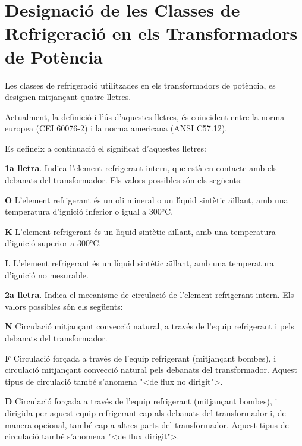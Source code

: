 \chapter{Designaci\'{o} de les Classes de Refrigeraci\'{o}
en els Transformadors de Pot\`{e}ncia}
  

Les classes de refrigeraci\'{o} utilitzades en els transformadors de
pot\`{e}ncia, es designen mitjan\c{c}ant quatre lletres.

Actualment, la definici\'{o} i l'\'{u}s d'aquestes lletres, \'{e}s coincident
entre la norma europea (\textsf{CEI 60076-2}) i la norma americana
(\textsf{ANSI C57.12}).

Es defineix a continuaci\'{o} el significat d'aquestes lletres:

\textbf{1a lletra}. Indica l'element refrigerant intern, que est\`{a} en
contacte amb els debanats del transformador. Els valors possibles
s\'{o}n els seg\"{u}ents:
\begin{list}{}
   {\setlength{\labelwidth}{10mm} \setlength{\leftmargin}{10mm} \setlength{\labelsep}{2mm}}
   \item[\textbf{O}] L'element refrigerant \'{e}s un oli mineral o un l\'{\i}quid sint\`{e}tic a\"{\i}llant, amb una temperatura d'ignici\'{o}
   inferior o igual a 300\unit{\celsius}.
   \item[\textbf{K}] L'element refrigerant \'{e}s un l\'{\i}quid sint\`{e}tic a\"{\i}llant, amb una temperatura d'ignici\'{o}
   superior a 300\unit{\celsius}.
   \item[\textbf{L}] L'element refrigerant \'{e}s un l\'{\i}quid sint\`{e}tic a\"{\i}llant, amb una temperatura d'ignici\'{o}
   no mesurable.
\end{list}
  

\textbf{2a lletra}. Indica el mecanisme de circulaci\'{o} de l'element
refrigerant intern. Els valors possibles s\'{o}n els seg\"{u}ents:
\begin{list}{}
   {\setlength{\labelwidth}{10mm} \setlength{\leftmargin}{10mm} \setlength{\labelsep}{2mm}}
   \item[\textbf{N}] Circulaci\'{o} mitjan\c{c}ant convecci\'{o} natural,
    a trav\'{e}s de l'equip refrigerant i pels debanats del transformador.
   \item[\textbf{F}] Circulaci\'{o} for\c{c}ada a trav\'{e}s de l'equip refrigerant (mitjan\c{c}ant bombes),
    i circulaci\'{o} mitjan\c{c}ant convecci\'{o} natural pels debanats del
    transformador. Aquest tipus de circulaci\'{o} tamb\'{e} s'anomena {"<}de flux no
    dirigit{">}.
   \item[\textbf{D}] Circulaci\'{o} for\c{c}ada a trav\'{e}s de l'equip refrigerant (mitjan\c{c}ant bombes),
    i dirigida per aquest equip refrigerant cap als debanats del
    transformador i, de manera opcional, tamb\'{e} cap a altres parts del transformador. Aquest
    tipus de circulaci\'{o} tamb\'{e} s'anomena {"<}de flux dirigit{">}.
\end{list}
  

